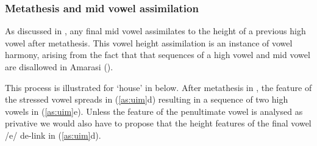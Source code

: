 \subsubsection{Metathesis and mid vowel assimilation}
As discussed in , any final mid vowel
assimilates to the height of a previous high vowel after metathesis.
This vowel height assimilation is an instance of vowel harmony,
arising from the fact that that sequences of a high vowel and mid vowel
are disallowed in Amarasi ().

This process is illustrated for  {\ra}  `house' in  below.
After metathesis in , the feature \tsc{[+high]}
of the stressed vowel spreads in (\ref{as:uim}d)
resulting in a sequence of two high vowels in (\ref{as:uim}e).
Unless the \tsc{[+high]} feature of the penultimate vowel is analysed
as privative we would also have to propose that the height features
 of the final vowel /e/ de-link in (\ref{as:uim}d).

